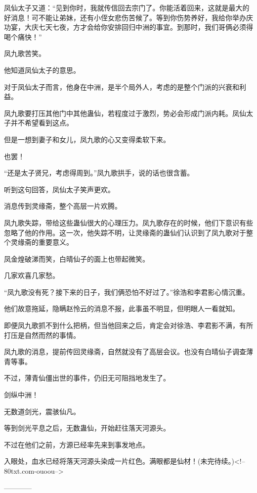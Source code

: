 \begin{this_body}
凤仙太子又道：“见到你时，我就传信回去宗门了。你能活着回来，这就是最大的好消息！可不能让弟妹，还有小侄女悲伤苦候了。等到你伤势养好，我给你举办庆功宴，大庆七天七夜，方才会给你安排回归中洲的事宜。到那时，我们哥俩必须得喝个痛快！”

凤九歌苦笑。

他知道凤仙太子的意思。

对于凤仙太子而言，他身在中洲，是半个局外人，考虑的是整个门派的兴衰和利益。

凤九歌要打压其他门中其他蛊仙，若程度过于激烈，势必会形成门派内耗。凤仙太子并不希望看到这点。

但是一想到妻子和女儿，凤九歌的心又变得柔软下来。

也罢！

“还是太子贤兄，考虑得周到。”凤九歌拱手，说的话也很含蓄。

听到这句回答，凤仙太子笑声更欢。

消息传到灵缘斋，整个高层一片欢腾。

凤九歌失踪，带给这些蛊仙很大的心理压力。凤九歌存在的时候，他们下意识有些忽略了他的作用。这一次，他失踪不明，让灵缘斋的蛊仙们认识到了凤九歌对于整个灵缘斋的重要意义。

凤金煌破涕而笑，白晴仙子的面上也带起微笑。

几家欢喜几家愁。

“凤九歌没有死？接下来的日子，我们俩恐怕不好过了。”徐浩和李君影心情沉重。

他们故意拖延，隐瞒赵怜云的消息不报，此事虽不明显，但明眼人一看就知。

即便凤九歌抓不到什么把柄，但当他回来之后，肯定会对徐浩、李君影不满，有所打压是自然而然的事情。

凤九歌的消息，提前传回灵缘斋，自然就没有了高层会议。也没有白晴仙子调查薄青等事。

不过，薄青仙僵出世的事件，仍旧无可阻挡地发生了。

剑纵中洲！

无数道剑光，震骇仙凡。

等到剑光平息之后，无数蛊仙，开始赶往落天河源头。

不过在他们之前，方源已经率先来到事发地点。

入眼处，血水已经将落天河源头染成一片红色。满眼都是仙材！(未完待续。)<!--80txt.com-ouoou-->

------------

\end{this_body}

